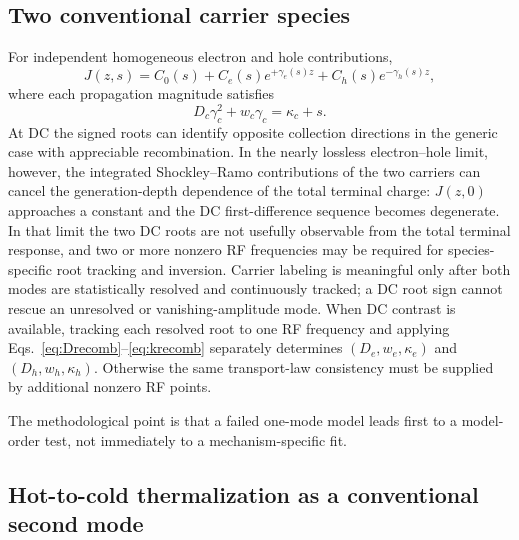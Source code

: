 \documentclass[11pt]{article}
\begin{document}
\subsection{Two conventional carrier species}

For independent homogeneous electron and hole contributions,
\begin{equation}
J(z,s)=C_0(s)+C_e(s)e^{+\gamma_e(s)z}+C_h(s)e^{-\gamma_h(s)z},
\end{equation}
where each propagation magnitude satisfies
\begin{equation}
D_c\gamma_c^2+w_c\gamma_c=\kappa_c+s.
\end{equation}
At DC the signed roots can identify opposite collection directions in the generic case with appreciable recombination. In the nearly lossless electron--hole limit, however, the integrated Shockley--Ramo contributions of the two carriers can cancel the generation-depth dependence of the total terminal charge: $J(z,0)$ approaches a constant and the DC first-difference sequence becomes degenerate. In that limit the two DC roots are not usefully observable from the total terminal response, and two or more nonzero RF frequencies may be required for species-specific root tracking and inversion. Carrier labeling is meaningful only after both modes are statistically resolved and continuously tracked; a DC root sign cannot rescue an unresolved or vanishing-amplitude mode. When DC contrast is available, tracking each resolved root to one RF frequency and applying Eqs.~\eqref{eq:Drecomb}--\eqref{eq:krecomb} separately determines $(D_e,w_e,\kappa_e)$ and $(D_h,w_h,\kappa_h)$. Otherwise the same transport-law consistency must be supplied by additional nonzero RF points.

The methodological point is that a failed one-mode model leads first to a model-order test, not immediately to a mechanism-specific fit.

\subsection{Hot-to-cold thermalization as a conventional second mode}
\end{document}
